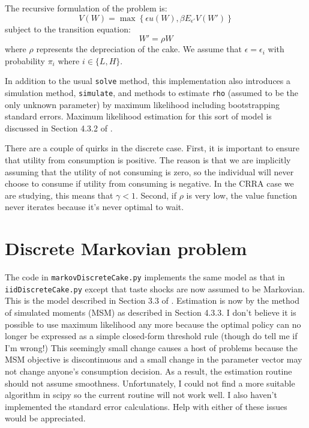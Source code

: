 \documentclass[12pt]{article}
\begin{document}
The recursive formulation of the problem is:
\begin{equation}
	V(W) = \max \left\{\epsilon u(W), \beta E_{\epsilon'} V(W') \right\}
\end{equation}
subject to the transition equation:
\begin{equation}
	W' = \rho W
\end{equation}
where \(\rho\) represents the depreciation of the cake. We assume that \(\epsilon = \epsilon_i\) with probability \(\pi_i\) where \(i \in \{L, H\}\).

In addition to the usual \texttt{solve} method, this implementation also introduces a simulation method, \texttt{simulate}, and methods to estimate \texttt{rho} (assumed to be the only unknown parameter) by maximum likelihood including bootstrapping standard errors. Maximum likelihood estimation for this sort of model is discussed in Section 4.3.2 of \citet{adda2003dynamic}.

There are a couple of quirks in the discrete case. First, it is important to ensure that utility from consumption is positive. The reason is that we are implicitly assuming that the utility of not consuming is zero, so the individual will never choose to consume if utility from consuming is negative. In the CRRA case we are studying, this means that \(\gamma < 1\). Second, if \(\rho\) is very low, the value function never iterates because it's never optimal to wait.


\section{Discrete Markovian problem}

The code in \texttt{markovDiscreteCake.py} implements the same model as that in \texttt{iidDiscreteCake.py} except that taste shocks are now assumed to be Markovian. This is the model described in Section 3.3 of \citet{adda2003dynamic}. Estimation is now by the method of simulated moments (MSM) as described in Section 4.3.3. I don't believe it is possible to use maximum likelihood any more because the optimal policy can no longer be expressed as a simple closed-form threshold rule (though do tell me if I'm wrong!) This seemingly small change causes a host of problems because the MSM objective is discontinuous and a small change in the parameter vector may not change anyone's consumption decision. As a result, the estimation routine should not assume smoothness. Unfortunately, I could not find a more suitable algorithm in scipy so the current routine will not work well. I also haven't implemented the standard error calculations. Help with either of these issues would be appreciated.



\end{document}
